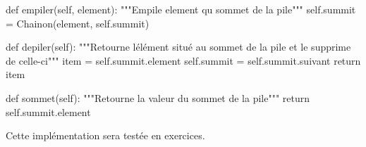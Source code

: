 \documentclass[
  a4paper,
  DIV=11,
  numbers=noendperiod]{scrartcl}
\newenvironment{Shaded}{\begin{snugshade}}{\end{snugshade}}
\newcommand{\CommentTok}[1]{\textcolor[rgb]{0.37,0.37,0.37}{#1}}
\newcommand{\ControlFlowTok}[1]{\textcolor[rgb]{0.00,0.23,0.31}{#1}}
\newcommand{\KeywordTok}[1]{\textcolor[rgb]{0.00,0.23,0.31}{#1}}
\newcommand{\NormalTok}[1]{\textcolor[rgb]{0.00,0.23,0.31}{#1}}
\newcommand{\OperatorTok}[1]{\textcolor[rgb]{0.37,0.37,0.37}{#1}}
\newcommand{\VariableTok}[1]{\textcolor[rgb]{0.07,0.07,0.07}{#1}}
\begin{document}
\begin{Shaded}
\begin{Highlighting}[]
    \KeywordTok{def}\NormalTok{ empiler(}\VariableTok{self}\NormalTok{, element):}
        \CommentTok{"""Empile element qu sommet de la pile"""}
        \VariableTok{self}\NormalTok{.summit }\OperatorTok{=}\NormalTok{ Chainon(element, }\VariableTok{self}\NormalTok{.summit)}

    \KeywordTok{def}\NormalTok{ depiler(}\VariableTok{self}\NormalTok{):}
        \CommentTok{"""Retourne l\textquotesingle{}élément situé au sommet de la pile}
\CommentTok{        et le supprime de celle{-}ci"""}
\NormalTok{        item }\OperatorTok{=} \VariableTok{self}\NormalTok{.summit.element}
        \VariableTok{self}\NormalTok{.summit }\OperatorTok{=} \VariableTok{self}\NormalTok{.summit.suivant}
        \ControlFlowTok{return}\NormalTok{ item}

    \KeywordTok{def}\NormalTok{ sommet(}\VariableTok{self}\NormalTok{):}
        \CommentTok{"""Retourne la valeur du sommet de la pile"""}
        \ControlFlowTok{return} \VariableTok{self}\NormalTok{.summit.element}

\end{Highlighting}
\end{Shaded}

Cette implémentation sera testée en exercices.
\end{document}
